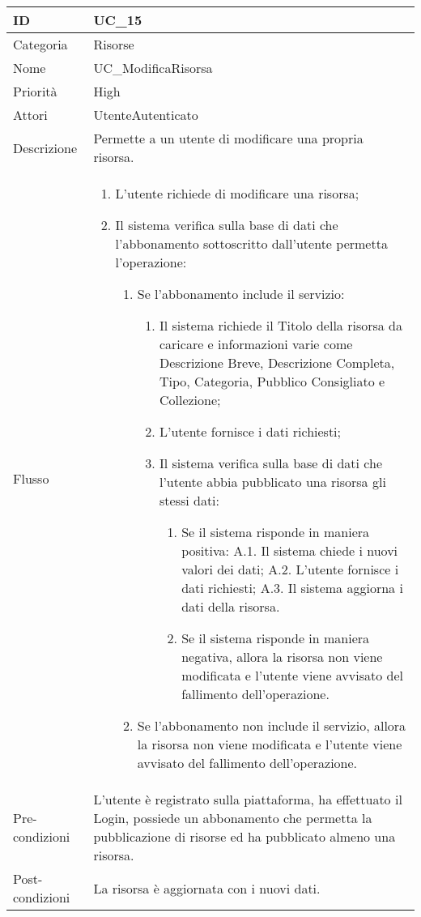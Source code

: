 \begin{center}
\begin{tabular}{ |p{2cm}|p{13cm}|  }
\hline
ID & UC\_15 \\\hline
Categoria & Risorse\\\hline
Nome & UC\_ModificaRisorsa\\\hline
Priorità & High \\\hline
Attori &  UtenteAutenticato \\\hline
Descrizione & Permette a un utente di modificare una propria risorsa.\\\hline
Flusso &  	\begin{enumerate}
			\item L'utente richiede di modificare una risorsa;
			\item Il sistema verifica sulla base di dati che l'abbonamento sottoscritto dall'utente permetta l'operazione:
			\begin{enumerate}
				\item Se l'abbonamento include il servizio:
				\begin{enumerate}
					\item Il sistema richiede il Titolo della risorsa da caricare e informazioni varie come Descrizione Breve,  Descrizione Completa, Tipo, Categoria, Pubblico Consigliato e Collezione;
					\item L'utente fornisce i dati richiesti;
					\item Il sistema verifica sulla base di dati che l'utente abbia pubblicato una risorsa gli stessi dati:
					\begin{enumerate}
						\item Se il sistema risponde in maniera positiva:
							\subitem A.1. Il sistema chiede i nuovi valori dei dati;
							\subitem A.2. L'utente fornisce i dati richiesti;
							\subitem A.3. Il sistema aggiorna i dati della risorsa.
						\item Se il sistema risponde in maniera negativa, allora  la risorsa non viene modificata e l'utente viene avvisato del fallimento dell'operazione.
					\end{enumerate}
				\end{enumerate}
				\item Se l'abbonamento non include il servizio, allora la risorsa non viene modificata e l'utente viene avvisato del fallimento dell'operazione.
			\end{enumerate}
		\end{enumerate}\\\hline
Pre-condizioni & L'utente è registrato sulla piattaforma, ha effettuato il Login, possiede un abbonamento che permetta la pubblicazione di risorse ed ha pubblicato almeno una risorsa.\\\hline
Post-condizioni & La risorsa è aggiornata con i nuovi dati.\\\hline
\end{tabular}
\label{table_use_case:15}\newline



\end{center}
